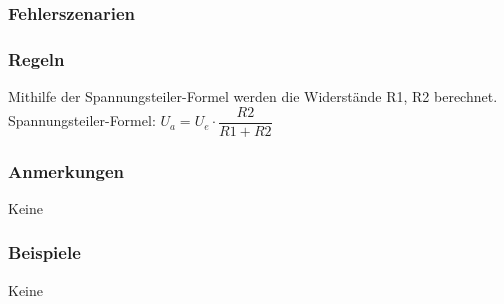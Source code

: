%
%



\subsubsection{Fehlerszenarien}


\subsubsection{Regeln}
Mithilfe der Spannungsteiler-Formel werden die Widerstände R1, R2 berechnet.\\
Spannungsteiler-Formel: $U_a = U_e\cdot \dfrac{R2}{R1+R2}$

\subsubsection{Anmerkungen}
Keine

\subsubsection{Beispiele}
Keine